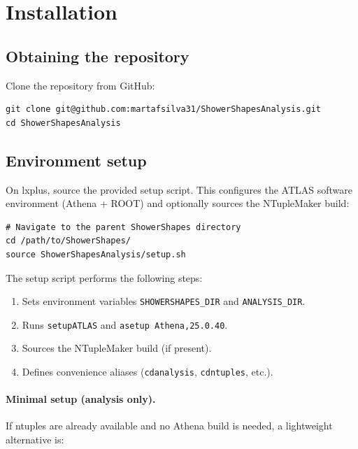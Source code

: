 \documentclass[12pt,a4paper]{article}
\begin{document}
\section{Installation}
\label{sec:installation}

\subsection{Obtaining the repository}

Clone the repository from GitHub:

\begin{lstlisting}
git clone git@github.com:martafsilva31/ShowerShapesAnalysis.git
cd ShowerShapesAnalysis
\end{lstlisting}

\subsection{Environment setup}

On lxplus, source the provided setup script. This configures the ATLAS
software environment (Athena + ROOT) and optionally sources the
NTupleMaker build:

\begin{lstlisting}
# Navigate to the parent ShowerShapes directory
cd /path/to/ShowerShapes/
source ShowerShapesAnalysis/setup.sh
\end{lstlisting}

The setup script performs the following steps:
\begin{enumerate}[leftmargin=2em]
  \item Sets environment variables \texttt{SHOWERSHAPES\_DIR} and
    \texttt{ANALYSIS\_DIR}.
  \item Runs \texttt{setupATLAS} and \texttt{asetup Athena,25.0.40}.
  \item Sources the NTupleMaker build (if present).
  \item Defines convenience aliases (\texttt{cdanalysis},
    \texttt{cdntuples}, etc.).
\end{enumerate}

\paragraph{Minimal setup (analysis only).} If ntuples are already
available and no Athena build is needed, a lightweight alternative is:
\end{document}
